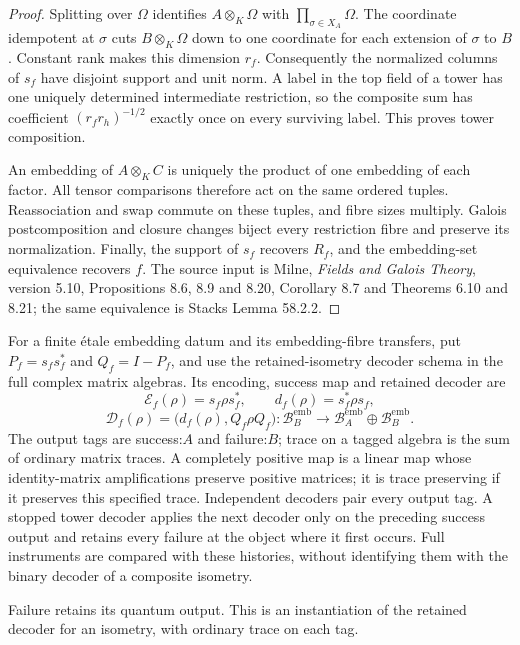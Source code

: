 \begin{proof}
Splitting over $\Omega$ identifies $A\otimes_K\Omega$ with
$\prod_{\sigma\in X_A}\Omega$. The coordinate idempotent at $\sigma$
cuts $B\otimes_K\Omega$ down to one coordinate for each extension of
$\sigma$ to $B$. Constant rank makes this dimension $r_f$.
Consequently the normalized columns of $s_f$ have disjoint support and
unit norm. A label in the top field of a tower has one uniquely determined
intermediate restriction, so the composite sum has coefficient
$(r_fr_h)^{-1/2}$ exactly once on every surviving label. This proves tower
composition.

An embedding of $A\otimes_K C$ is uniquely the product of one embedding
of each factor. All tensor comparisons therefore act on the same ordered
tuples. Reassociation and swap commute on these tuples, and fibre sizes
multiply. Galois postcomposition and closure changes biject every
restriction fibre and preserve its normalization. Finally, the support
of $s_f$ recovers $R_f$, and the embedding-set equivalence recovers $f$.
The source input is Milne, \emph{Fields and Galois Theory}, version 5.10,
Propositions 8.6, 8.9 and 8.20, Corollary 8.7 and Theorems 6.10 and 8.21;
the same equivalence is Stacks Lemma 58.2.2.
\end{proof}

\begin{definition}
For a finite \'etale embedding datum and its embedding-fibre transfers,
put $P_f=s_fs_f^*$ and $Q_f=I-P_f$, and use the retained-isometry decoder
schema in the full complex matrix algebras. Its encoding, success map
and retained decoder are
\[
 \mathcal E_f(\rho)=s_f\rho s_f^*,\qquad
 d_f(\rho)=s_f^*\rho s_f,
\]
\[
 \mathcal D_f(\rho)=\bigl(d_f(\rho),Q_f\rho Q_f\bigr):
 \mathcal B_B^{\mathrm{emb}}\longrightarrow
 \mathcal B_A^{\mathrm{emb}}\oplus\mathcal B_B^{\mathrm{emb}}.
\]
The output tags are success:$A$ and failure:$B$; trace on a tagged algebra
is the sum of ordinary matrix traces. A completely positive map is a
linear map whose identity-matrix amplifications preserve positive matrices;
it is trace preserving if it preserves this specified trace. Independent
decoders pair every output tag. A stopped tower decoder applies the next
decoder only on the preceding success output and retains every failure
at the object where it first occurs. Full instruments are compared with
these histories, without identifying them with the binary decoder of a
composite isometry.
\end{definition}
\begin{scope}
Failure retains its quantum output. This is an instantiation of the
retained decoder for an isometry, with ordinary trace on each tag.
\end{scope}


